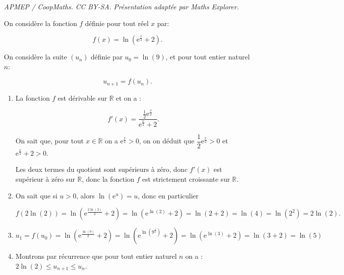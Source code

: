 \documentclass[10pt]{article}
\providecommand{\R}{\mathbb{R}}
\begin{document}
\noindent\textit{APMEP / CoopMaths. CC BY-SA. Présentation adaptée par Maths Explorer.}\par\medskip
\smallskip

On considère la fonction $f$ définie pour tout réel $x$ par:

\[f(x) = \ln\left ( \text{e}^{\frac{x}{2}}+2 \right ).\]

On considère la suite $(u_n)$ définie par $u_0= \ln\left (9\right )$, et pour tout entier naturel $n$:

\[u_{n+1}= f\left (u_n\right ).\]

\begin{enumerate}
	\item La fonction $f$ est dérivable sur $\R$ et on a :

	\[\boxed{f'(x) = \dfrac{\textstyle\frac{1}{2}\text{e}^{\frac{x}{2}}}{\text{e}^{\frac{x}{2}}+2}}.\]

	\smallskip

On sait que, pour tout $x \in \R$ on a $\text{e}^{\frac{x}{2}} > 0$, on on déduit que 
$\dfrac12 \text{e}^{\frac{x}{2}} > 0$ et  $\text{e}^{\frac{x}{2}} + 2 > 0$.

Les deux termes du quotient sont supérieurs à zéro, donc  $f'(x)$ est supérieur à zéro sur $\R$, donc la fonction $f$ est strictement croissante sur $\R$.

	\item On sait que si $u > 0$, \: alors $\ln \left(\text{e}^{u}\right) = u$, donc en particulier 
	
\[f\left(2\ln(2)\right) = \ln\left(\text{e}^{\frac{2\ln(2)}{2}} + 2\right) = \ln\left(\text{e}^{\ln(2)} + 2\right) = \ln(2 + 2) = \ln(4) = \ln\left(2^{2}\right) = \boxed{2\ln(2)}.\]

	\item \quad $u_{1} = f\left(u_{0}\right) = \ln\left(\text{e}^{\frac{\ln(9)}{2}} + 2\right) = \ln\left(\text{e}^{\ln\left(9^{\frac{1}{2}}\right)} + 2\right) = \ln\left(\text{e}^{\ln(3)} + 2\right) = \ln(3 + 2) = \boxed{\ln(5)}$
	
	\item Montrons par récurrence que pour tout entier naturel $n$ on a : $2\ln(2) \leqslant u_{n+1} \leqslant u_{n}$.

\end{enumerate}
\end{document}
